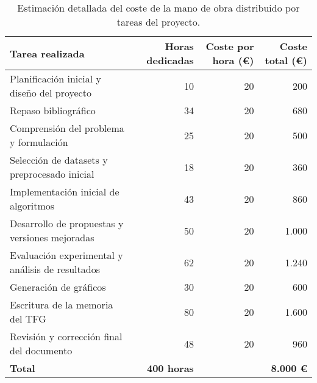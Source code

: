 \begin{table}[htp]
    \centering
    \begin{adjustbox}{width=\linewidth}
        \begin{tabular}{|l|r|r|r|}
            \hline
            \textbf{Tarea realizada}                         & \textbf{Horas dedicadas} & \textbf{Coste por hora (€)} & \textbf{Coste total (€)} \\ \hline
            Planificación inicial y diseño del proyecto      & 10                       & 20                          & 200                      \\
            Repaso bibliográfico                             & 34                       & 20                          & 680                      \\
            Comprensión del problema y formulación           & 25                       & 20                          & 500                      \\
            Selección de datasets y preprocesado inicial     & 18                       & 20                          & 360                      \\
            Implementación inicial de algoritmos             & 43                       & 20                          & 860                      \\
            Desarrollo de propuestas y versiones mejoradas   & 50                       & 20                          & 1.000                   \\
            Evaluación experimental y análisis de resultados & 62                       & 20                          & 1.240                   \\
            Generación de gráficos                           & 30                       & 20                          & 600                      \\
            Escritura de la memoria del TFG                  & 80                       & 20                          & 1.600                   \\
            Revisión y corrección final del documento        & 48                       & 20                          & 960                      \\ \hline
            \textbf{Total}                                   & \textbf{400 horas}       &                             & \textbf{8.000 €}         \\ \hline
        \end{tabular}
    \end{adjustbox}
    \caption{Estimación detallada del coste de la mano de obra distribuido por tareas del proyecto.}
    \label{tab:mano-de-obra}
\end{table}


